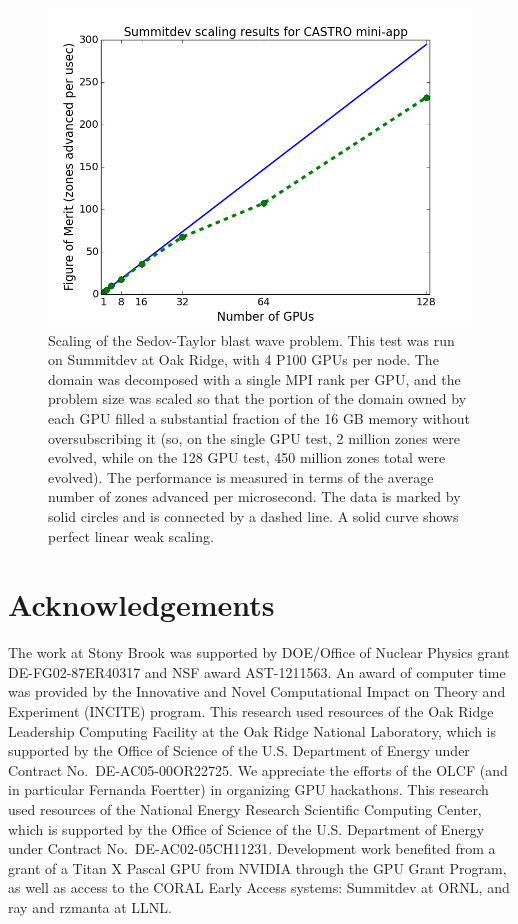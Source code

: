 \documentclass[numberedappendix]{aastex6}
\begin{document}
\begin{figure}[h!]
  \begin{center}
    \includegraphics[scale=0.65]{scaling.png}
    \caption{Scaling of the Sedov-Taylor blast wave problem. This test was run
      on Summitdev at Oak Ridge, with 4 P100 GPUs per node. The domain was decomposed with
      a single MPI rank per GPU, and the problem size was scaled so that the portion
      of the domain owned by each GPU filled a substantial fraction of the 16 GB memory
      without oversubscribing it (so, on the single GPU test, 2 million zones were
      evolved, while on the 128 GPU test, 450 million zones total were evolved). The
      performance is measured in terms of the average number of zones advanced per
      microsecond. The data is marked by solid circles and is connected by a dashed
      line. A solid curve shows perfect linear weak scaling.}
  \end{center}
\end{figure}

\clearpage

\section{Acknowledgements}

The work at Stony Brook was supported by DOE/Office of Nuclear
Physics grant DE-FG02-87ER40317 and NSF award AST-1211563.  An award
of computer time was provided by the Innovative and Novel
Computational Impact on Theory and Experiment (INCITE) program.  This
research used resources of the Oak Ridge Leadership Computing Facility
at the Oak Ridge National Laboratory, which is supported by the Office
of Science of the U.S. Department of Energy under Contract
No.\ DE-AC05-00OR22725.  We appreciate the efforts of the OLCF (and in
particular Fernanda Foertter) in organizing GPU hackathons.  This
research used resources of the National Energy Research Scientific
Computing Center, which is supported by the Office of Science of the
U.S. Department of Energy under Contract No.\ DE-AC02-05CH11231.
Development work benefited from a grant of a Titan X Pascal GPU
from NVIDIA through the GPU Grant Program, as well as access to
the CORAL Early Access systems: Summitdev at ORNL, and ray and rzmanta
at LLNL.



\end{document}
